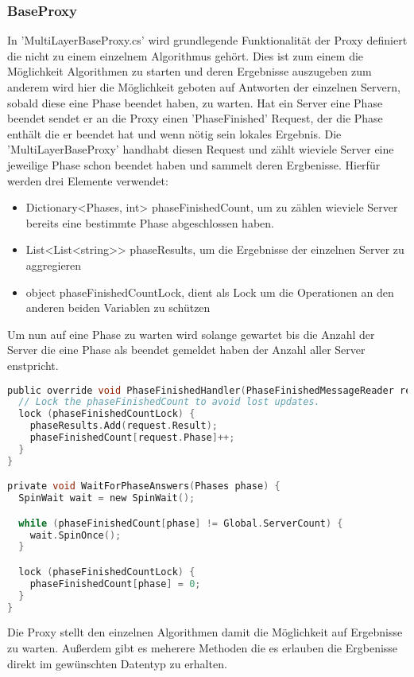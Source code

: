 \subsubsection{BaseProxy}

In 'MultiLayerBaseProxy.cs' wird grundlegende Funktionalität der Proxy definiert die nicht zu einem einzelnem Algorithmus gehört. Dies ist zum einem die Möglichkeit Algorithmen zu starten und deren Ergebnisse auszugeben zum anderem wird hier die Möglichkeit geboten auf Antworten der einzelnen Servern, sobald diese eine Phase beendet haben, zu warten.
Hat ein Server eine Phase beendet sendet er an die Proxy einen 'PhaseFinished' Request, der die Phase enthält die er beendet hat und wenn nötig sein lokales Ergebnis. Die 'MultiLayerBaseProxy' handhabt diesen Request und zählt wieviele Server eine jeweilige Phase schon beendet haben und sammelt deren Ergbenisse. Hierfür werden drei Elemente verwendet:

\begin{itemize}
  \item Dictionary<Phases, int> phaseFinishedCount, um zu zählen wieviele Server bereits eine bestimmte Phase abgeschlossen haben.
  \item List<List<string>> phaseResults, um die Ergebnisse der einzelnen Server zu aggregieren
  \item object phaseFinishedCountLock, dient als Lock um die Operationen an den anderen beiden Variablen zu schützen
\end{itemize}


Um nun auf eine Phase zu warten wird solange gewartet bis die Anzahl der Server die eine Phase als beendet gemeldet haben der Anzahl aller Server enstpricht.

\begin{lstlisting}[language=c]
public override void PhaseFinishedHandler(PhaseFinishedMessageReader request) {
  // Lock the phaseFinishedCount to avoid lost updates.
  lock (phaseFinishedCountLock) {
    phaseResults.Add(request.Result);
    phaseFinishedCount[request.Phase]++;
  }
}

private void WaitForPhaseAnswers(Phases phase) {
  SpinWait wait = new SpinWait();

  while (phaseFinishedCount[phase] != Global.ServerCount) {
    wait.SpinOnce();
  }

  lock (phaseFinishedCountLock) {
    phaseFinishedCount[phase] = 0;
  }
}
\end{lstlisting}

Die Proxy stellt den einzelnen Algorithmen damit die Möglichkeit auf Ergebnisse zu warten. Außerdem gibt es meherere Methoden die es erlauben die Ergbenisse direkt im gewünschten Datentyp zu erhalten.

